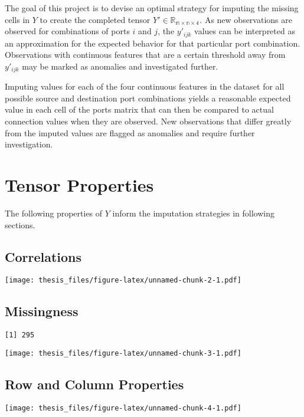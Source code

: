 \documentclass[12pt,twoside]{dukestatscithesis}
\theoremstyle{definition}
\theoremstyle{definition}
\theoremstyle{definition}
\theoremstyle{remark}
\begin{document}
The goal of this project is to devise an optimal strategy for imputing
the missing cells in \(Y\) to create the completed tensor
\(Y' \in \mathbb{R_{m \times n \times 4}}\). As new observations are
observed for combinations of ports \(i\) and \(j\), the \(y'_{ijk}\)
values can be interpreted as an approximation for the expected behavior
for that particular port combination. Observations with continuous
features that are a certain threshold away from \(y'_{ijk}\) may be
marked as anomalies and investigated further.

Imputing values for each of the four continuous features in the dataset
for all possible source and destination port combinations yields a
reasonable expected value in each cell of the ports matrix that can then
be compared to actual connection values when they are observed. New
observations that differ greatly from the imputed values are flagged as
anomalies and require further investigation.

\section{Tensor Properties}\label{tensor-properties}

The following properties of \(Y\) inform the imputation strategies in
following sections.

\subsection{Correlations}\label{correlations}

\texttt{[image: thesis\_files/figure-latex/unnamed-chunk-2-1.pdf]}

\subsection{Missingness}\label{missingness}
\begin{verbatim}
[1] 295
\end{verbatim}
\texttt{[image: thesis\_files/figure-latex/unnamed-chunk-3-1.pdf]}

\subsection{Row and Column Properties}\label{row-and-column-properties}

\texttt{[image: thesis\_files/figure-latex/unnamed-chunk-4-1.pdf]}
\end{document}
